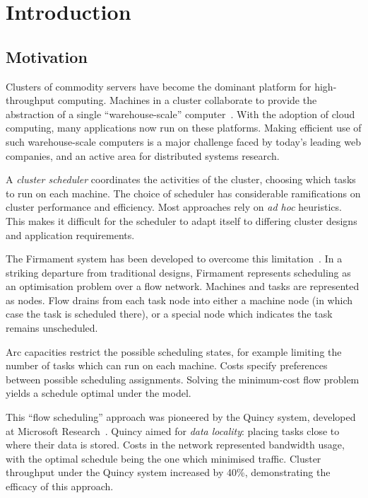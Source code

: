 \chapter{Introduction} \label{chap:intro}


\section{Motivation} \label{sec:intro-motivation}
Clusters of commodity servers have become the dominant platform for high-throughput computing. Machines in a cluster collaborate to provide the abstraction of a single ``warehouse-scale'' computer~\cite{WarehouseScale:2009}. With the adoption of cloud computing, many applications now run on these platforms. Making efficient use of such warehouse-scale computers is a major challenge faced by today's leading web companies, and an active area for distributed systems research.

A \emph{cluster scheduler} coordinates the activities of the cluster, choosing which tasks to run on each machine. The choice of scheduler has considerable ramifications on cluster performance and efficiency. Most approaches rely on \emph{ad hoc} heuristics. This makes it difficult for the scheduler to adapt itself to differing cluster designs and application requirements.

The Firmament system has been developed to overcome this limitation\footnotemark~\cite{Schwarzkopf:2015}. In a striking departure from traditional designs, Firmament represents scheduling as an optimisation problem over a flow network. Machines and tasks are represented as nodes. Flow drains from each task node into either a machine node (in which case the task is scheduled there), or a special node which indicates the task remains unscheduled.

Arc capacities restrict the possible scheduling states, for example limiting the number of tasks which can run on each machine. Costs specify preferences between possible scheduling assignments. Solving the minimum-cost flow problem yields a schedule optimal under the model.

This ``flow scheduling'' approach was pioneered by the Quincy system, developed at Microsoft Research~\cite{Isard:2009}. Quincy aimed for \emph{data locality}: placing tasks close to where their data is stored. Costs in the network represented bandwidth usage, with the optimal schedule being the one which minimised traffic. Cluster throughput under the Quincy system increased by 40\%, demonstrating the efficacy of this approach.

